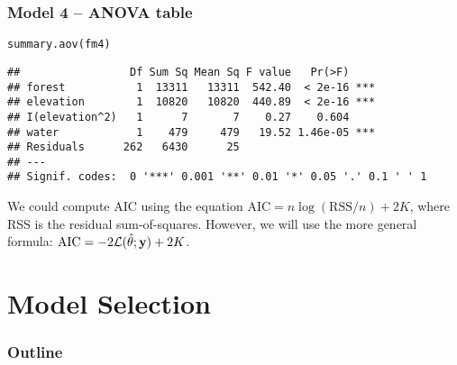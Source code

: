 \documentclass[color=usenames,dvipsnames]{beamer}\usepackage[]{graphicx}\usepackage[]{color}
\makeatletter
\newcommand{\hlstd}[1]{\textcolor[rgb]{0,0,0}{#1}}%
\newcommand{\hlkwd}[1]{\textcolor[rgb]{0.004,0.004,0.506}{#1}}%
\newenvironment{kframe}{%
 \def\at@end@of@kframe{}%
 \ifinner\ifhmode%
  \def\at@end@of@kframe{\end{minipage}}%
  \begin{minipage}{\columnwidth}%
 \fi\fi%
 \def\FrameCommand##1{\hskip\@totalleftmargin \hskip-\fboxsep
 \colorbox{shadecolor}{##1}\hskip-\fboxsep
     \hskip-\linewidth \hskip-\@totalleftmargin \hskip\columnwidth}%
 \MakeFramed {\advance\hsize-\width
   \@totalleftmargin\z@ \linewidth\hsize
   \@setminipage}}%
 {\par\unskip\endMakeFramed%
 \at@end@of@kframe}
\newenvironment{knitrout}{}{} %
\makeatother
\begin{document}
\begin{frame}[fragile]
  \frametitle{Model 4 -- ANOVA table}
\begin{knitrout}\scriptsize
{}\color{fgcolor}\begin{kframe}
\begin{alltt}
\hlkwd{summary.aov}\hlstd{(fm4)}
\end{alltt}
\begin{verbatim}
##                 Df Sum Sq Mean Sq F value   Pr(>F)    
## forest           1  13311   13311  542.40  < 2e-16 ***
## elevation        1  10820   10820  440.89  < 2e-16 ***
## I(elevation^2)   1      7       7    0.27    0.604    
## water            1    479     479   19.52 1.46e-05 ***
## Residuals      262   6430      25                     
## ---
## Signif. codes:  0 '***' 0.001 '**' 0.01 '*' 0.05 '.' 0.1 ' ' 1
\end{verbatim}
\end{kframe}
\end{knitrout}
\small
We could compute AIC using the equation
$\mathrm{AIC}=n\log(\mathrm{RSS}/n)+2K$, where RSS is the residual
sum-of-squares.
\pause
\vfill
However, we will use the more general formula: $\mathrm{AIC} =
-2\mathcal{L}(\hat{\theta} ; {\bf y}) + 2K$.
\end{frame}







\section{Model Selection}






\begin{frame}[plain]
  \frametitle{Outline}
  \huge
  \tableofcontents[currentsection]
\end{frame}
\end{document}
